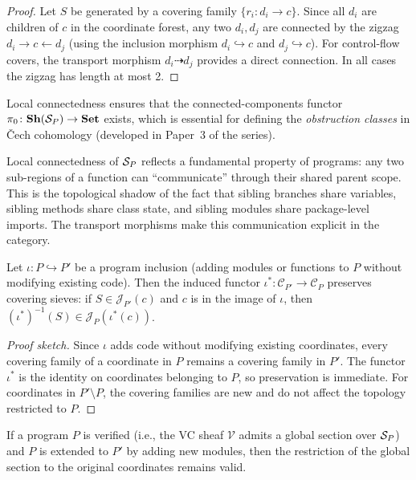 \documentclass[11pt]{article}
\begin{document}
\begin{proof}
Let $S$ be generated by a covering family $\{r_i \colon d_i \to c\}$.  Since
all $d_i$ are children of $c$ in the coordinate forest, any two $d_i, d_j$
are connected by the zigzag $d_i \to c \leftarrow d_j$ (using the inclusion
morphism $d_i \hookrightarrow c$ and $d_j \hookrightarrow c$).  For
control-flow covers, the transport morphism $d_i \dashrightarrow d_j$ provides
a direct connection.  In all cases the zigzag has length at most 2.
\end{proof}

Local connectedness ensures that the connected-components functor
$\pi_0 \colon \mathbf{Sh}(\mathcal{S}_P) \to \mathbf{Set}$ exists, which is
essential for defining the \emph{obstruction classes} in Čech cohomology
(developed in Paper~3 of the series).

\begin{remark}
Local connectedness of $\mathcal{S}_P$ reflects a fundamental property of programs:
any two sub-regions of a function can ``communicate'' through their shared
parent scope.  This is the topological shadow of the fact that sibling
branches share variables, sibling methods share class state, and sibling
modules share package-level imports.  The transport morphisms make this
communication explicit in the category.
\end{remark}

\begin{theorem}\label{thm:inclusion-covers}
Let $\iota \colon P \hookrightarrow P'$ be a program inclusion (adding
modules or functions to $P$ without modifying existing code).  Then the
induced functor $\iota^* \colon \mathcal{C}_{P'} \to \mathcal{C}_P$
preserves covering sieves: if $S \in \mathscr{J}_{P'}(c)$ and $c$ is in
the image of $\iota$, then $(\iota^*)^{-1}(S) \in \mathscr{J}_P(\iota^*(c))$.
\end{theorem}

\begin{proof}[Proof sketch]
Since $\iota$ adds code without modifying existing coordinates, every covering
family of a coordinate in $P$ remains a covering family in $P'$.  The functor
$\iota^*$ is the identity on coordinates belonging to $P$, so preservation is
immediate.  For coordinates in $P' \setminus P$, the covering families are
new and do not affect the topology restricted to $P$.
\end{proof}

\begin{corollary}
If a program $P$ is verified (i.e., the VC sheaf $\mathcal{V}$ admits a
global section over $\mathcal{S}_P$) and $P$ is extended to $P'$ by adding new
modules, then the restriction of the global section to the original
coordinates remains valid.
\end{corollary}
\end{document}
